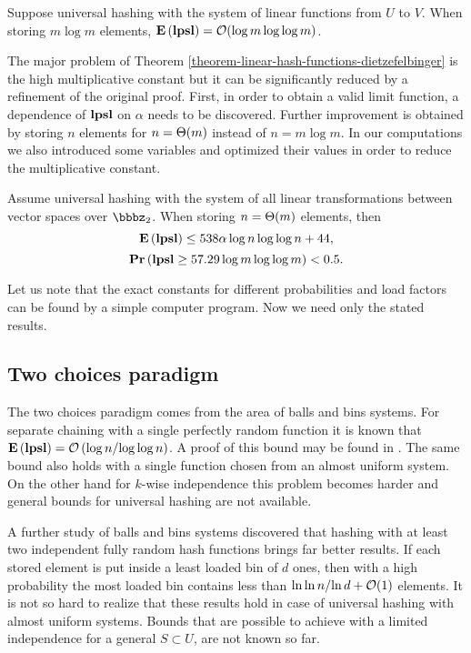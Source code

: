 \begin{theorem}
\label{theorem-linear-hash-functions-dietzefelbinger}
Suppose universal hashing with the system of linear functions from $U$ to $V$. When storing $m \log m$ elements, $\mathbf{E}\left(\mathbf{lpsl}\right) = \mathcal{O}(\log m \log \log m)$. 
\end{theorem}

The major problem of Theorem \ref{theorem-linear-hash-functions-dietzefelbinger} is the high multiplicative constant but it can be significantly reduced by a refinement of the original proof. First, in order to obtain a valid limit function, a dependence of $\mathbf{lpsl}$ on $\alpha$ needs to be discovered. Further improvement is obtained by storing $n$ elements for $n = \mathrm{\Theta}(m)$ instead of $n = m \log m$. In our computations we also introduced some variables and optimized their values in order to reduce the multiplicative constant.

\begin{theorem}
\label{theorem-linear-refined}
Assume universal hashing with the system of all linear transformations between vector spaces over $\bbbz_2$. When storing $n = \mathrm{\Theta}(m)$ elements, then $$\mathbf{E}\left(\mathbf{lpsl}\right) \leq 538 \alpha \log n \log \log n + 44,$$ $$\mathbf{Pr}\left(\mathbf{lpsl} \geq 57.29 \log m \log \log m\right) < 0.5.$$
\end{theorem}

Let us note that the exact constants for different probabilities and load factors can be found by a simple computer program. Now we need only the stated results.

\subsection{Two choices paradigm}
The two choices paradigm comes from the area of balls and bins systems. For separate chaining with a single perfectly random function it is known that $\mathbf{E}\left(\mathbf{lpsl}\right) = \mathcal{O}\left({\log n}/{\log \log n}\right)$. A proof of this bound may be found in \cite{DBLP:books/sp/Mehlhorn84}. The same bound also holds with a single function chosen from an almost uniform system. On the other hand for $k$-wise independence this problem becomes harder and general bounds for universal hashing are not available.

A further study \cite{DBLP:conf/stoc/AzarBKU94} of balls and bins systems discovered that hashing with at least two independent fully random hash functions brings far better results. If each stored element is put inside a least loaded bin of $d$ ones, then with a high probability the most loaded bin contains less than ${\ln \ln n}/{\ln d} + \mathcal{O}(1)$ elements. It is not so hard to realize that these results hold in case of universal hashing with almost uniform systems. Bounds that are possible to achieve with a limited independence for a general $S \subset U$, are not known so far.


